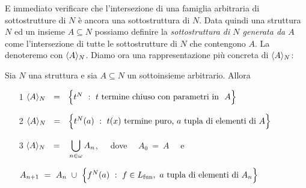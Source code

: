 E immediato verificare che l'intersezione di una famiglia arbitraria di sottostrutture di $N$ \`e ancora una sottostruttura di $N$. Data quindi una struttura $N$ ed un insieme $A\subseteq N$ possiamo definire la \emph{sottostruttura di $N$ generata da $A$\/} come l'intersezione di tutte le sottostrutture di $N$ che contengono $A$. La denoteremo con \emph{$\langle A\rangle_N$}. Diamo ora una rappresentazione pi\`u concreta di $\langle A\rangle_N$:
%
\begin{lemma}\label{strutturagenerata}
Sia $N$ una struttura e sia $A\subseteq N$ un sottoinsieme arbitrario. Allora
\begin{itemize}
\item[1] $\<A\>_N\ \ =\ \ \Big\{ t^N \ :\  t\ \textrm{termine chiuso con parametri in }\  A\Big\}$
\item[2] $\<A\>_N\ \ =\ \  \Big\{ t^N(a) \ :\  t(x)\textrm{ termine puro, }  a \textrm{ tupla di elementi di }A\Big\}$
\item[3] $\<A\>_N\ \ =\ \ \vphantom{\Big\{}\displaystyle\bigcup_{n\in\omega} A_n$,\ \ \ dove \ \ $A_0\ =\ A$ \ \ e

\hspace*{0mm}
$A_{n+1}\ =\ A_n\ \cup\ \Big\{ f^N(a) \ :\  f\in L_{\rm fun},\  a \textrm{ tupla di elementi di }A_n\Big\}$



\end{itemize}
\end{lemma}
%
